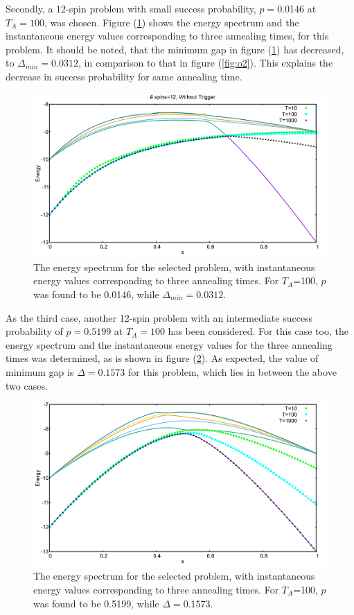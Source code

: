 \documentclass[../main.tex]{subfiles}
\begin{document}
Secondly, a 12-spin problem with small success probability, $p= $0.0146 at $T_A=100$, was chosen. Figure (\ref{fig:o3}) shows the energy spectrum and the instantaneous energy values corresponding to three annealing times, for this problem. It should be noted, that the minimum gap in figure (\ref{fig:o3}) has decreased, to $\Delta_{min} = 0.0312$, in comparison to that in figure (\ref{fig:o2}). This explains the decrease in success probability for same annealing time.\\
\begin{figure}[H]
\centering 
\includegraphics[scale=0.3]{950_s12_O.png}
\caption{The energy spectrum for the selected problem, with instantaneous energy values corresponding to three annealing times. For $T_A$=100, $p$ was found to be 0.0146, while $\Delta_{min}=0.0312.$}
\label{fig:o3}
\end{figure}


As the third case, another 12-spin problem with an intermediate success probability of $p=0.5199$ at $T_A= 100$ has been considered. For this case too, the energy spectrum and the instantaneous energy values for the three annealing times was determined, as is shown in figure (\ref{fig:o4}). As expected, the value of minimum gap is $\Delta=0.1573$ for this problem, which lies in between the above two cases. 
\begin{figure}[H]
\centering 
\includegraphics[scale=0.3]{528_s12_O.png}
\caption{The energy spectrum for the selected problem, with instantaneous energy values corresponding to three annealing times. For $T_A$=100, $p$ was found to be 0.5199, while $\Delta=0.1573.$}
\label{fig:o4}
\end{figure}
\end{document}
